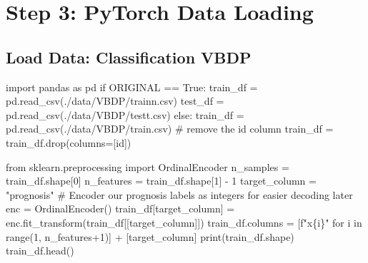 \documentclass[
  letterpaper,
  DIV=11,
  numbers=noendperiod]{scrreprt}
\newenvironment{Shaded}{\begin{snugshade}}{\end{snugshade}}
\newcommand{\BuiltInTok}[1]{\textcolor[rgb]{0.00,0.23,0.31}{#1}}
\newcommand{\CommentTok}[1]{\textcolor[rgb]{0.37,0.37,0.37}{#1}}
\newcommand{\ControlFlowTok}[1]{\textcolor[rgb]{0.00,0.23,0.31}{#1}}
\newcommand{\DecValTok}[1]{\textcolor[rgb]{0.68,0.00,0.00}{#1}}
\newcommand{\ImportTok}[1]{\textcolor[rgb]{0.00,0.46,0.62}{#1}}
\newcommand{\KeywordTok}[1]{\textcolor[rgb]{0.00,0.23,0.31}{#1}}
\newcommand{\NormalTok}[1]{\textcolor[rgb]{0.00,0.23,0.31}{#1}}
\newcommand{\OperatorTok}[1]{\textcolor[rgb]{0.37,0.37,0.37}{#1}}
\newcommand{\SpecialCharTok}[1]{\textcolor[rgb]{0.37,0.37,0.37}{#1}}
\newcommand{\SpecialStringTok}[1]{\textcolor[rgb]{0.13,0.47,0.30}{#1}}
\newcommand{\StringTok}[1]{\textcolor[rgb]{0.13,0.47,0.30}{#1}}
\newcommand{\VariableTok}[1]{\textcolor[rgb]{0.07,0.07,0.07}{#1}}
\begin{document}
\hypertarget{step-3-pytorch-data-loading}{%
\section{Step 3: PyTorch Data
Loading}\label{step-3-pytorch-data-loading}}

\hypertarget{load-data-classification-vbdp}{%
\subsection{Load Data: Classification
VBDP}\label{load-data-classification-vbdp}}

\begin{Shaded}
\begin{Highlighting}[]
\ImportTok{import}\NormalTok{ pandas }\ImportTok{as}\NormalTok{ pd}
\ControlFlowTok{if}\NormalTok{ ORIGINAL }\OperatorTok{==} \VariableTok{True}\NormalTok{:}
\NormalTok{    train\_df }\OperatorTok{=}\NormalTok{ pd.read\_csv(}\StringTok{\textquotesingle{}./data/VBDP/trainn.csv\textquotesingle{}}\NormalTok{)}
\NormalTok{    test\_df }\OperatorTok{=}\NormalTok{ pd.read\_csv(}\StringTok{\textquotesingle{}./data/VBDP/testt.csv\textquotesingle{}}\NormalTok{)}
\ControlFlowTok{else}\NormalTok{:}
\NormalTok{    train\_df }\OperatorTok{=}\NormalTok{ pd.read\_csv(}\StringTok{\textquotesingle{}./data/VBDP/train.csv\textquotesingle{}}\NormalTok{)}
    \CommentTok{\# remove the id column}
\NormalTok{    train\_df }\OperatorTok{=}\NormalTok{ train\_df.drop(columns}\OperatorTok{=}\NormalTok{[}\StringTok{\textquotesingle{}id\textquotesingle{}}\NormalTok{])}
\end{Highlighting}
\end{Shaded}

\begin{Shaded}
\begin{Highlighting}[]
\ImportTok{from}\NormalTok{ sklearn.preprocessing }\ImportTok{import}\NormalTok{ OrdinalEncoder}
\NormalTok{n\_samples }\OperatorTok{=}\NormalTok{ train\_df.shape[}\DecValTok{0}\NormalTok{]}
\NormalTok{n\_features }\OperatorTok{=}\NormalTok{ train\_df.shape[}\DecValTok{1}\NormalTok{] }\OperatorTok{{-}} \DecValTok{1}
\NormalTok{target\_column }\OperatorTok{=} \StringTok{"prognosis"}
\CommentTok{\# Encoder our prognosis labels as integers for easier decoding later}
\NormalTok{enc }\OperatorTok{=}\NormalTok{ OrdinalEncoder()}
\NormalTok{train\_df[target\_column] }\OperatorTok{=}\NormalTok{ enc.fit\_transform(train\_df[[target\_column]])}
\NormalTok{train\_df.columns }\OperatorTok{=}\NormalTok{ [}\SpecialStringTok{f"x}\SpecialCharTok{\{}\NormalTok{i}\SpecialCharTok{\}}\SpecialStringTok{"} \ControlFlowTok{for}\NormalTok{ i }\KeywordTok{in} \BuiltInTok{range}\NormalTok{(}\DecValTok{1}\NormalTok{, n\_features}\OperatorTok{+}\DecValTok{1}\NormalTok{)] }\OperatorTok{+}\NormalTok{ [target\_column]}
\BuiltInTok{print}\NormalTok{(train\_df.shape)}
\NormalTok{train\_df.head()}
\end{Highlighting}
\end{Shaded}
\end{document}
